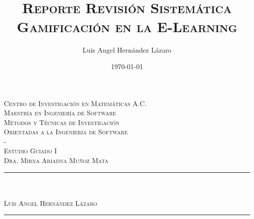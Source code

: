 \documentclass{report}
\title{\textsc{Reporte Revisión Sistemática\\Gamificación en la E-Learning}}
\author{Luis Angel Hernández Lázaro}
\date{\today}
\makeatletter
\let\thetitle\@title
\makeatother
\begin{document}

\begin{titlepage}
	\centering
    \vspace*{0.5 cm}
    
    \begin{figure}
		\centering
	\end{figure}
    \textsc{\LARGE Centro de Investigación en Matemáticas A.C.}\\[1.0 cm]
	\textsc{\Large Maestría en Ingeniería de Software}\\[0.5 cm]
	\textsc{\large Métodos y Técnicas de Investigación \\ Orientadas a la Ingeniería de Software\\{-}\\Estudio Guiado I\\Dra. Mirna Ariadna Muñoz Mata}\\[0.5 cm]
	\rule{\linewidth}{0.2 mm} \\[0.4 cm]
	{ \huge \bfseries \thetitle}\\ \textsc{\large Luis Angel Hernández Lázaro}
	\rule{\linewidth}{0.2 mm} \\[1.5 cm]
	

\end{titlepage}
\end{document}
